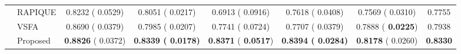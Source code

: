 \documentclass[journal]{IEEEtran}
\begin{document}
{{\begin{table*}[t]
\begin{tabular}{l|l|cccccc}
       & RAPIQUE & 0.8232 ({\color{grey} 0.0529}) & 0.8051 ({\color{grey} 0.0217}) & 0.6913 ({\color{grey} 0.0916}) & 0.7618 ({\color{grey} 0.0408}) & 0.7569 ({\color{grey} 0.0310}) & 0.7755 \\
       & VSFA & 0.8690 ({\color{grey} 0.0379}) & 0.7985 ({\color{grey} 0.0207}) & 0.7741 ({\color{grey} 0.0724}) & 0.7707 ({\color{grey} 0.0379}) & 0.7888 ({\color{grey}\bf{ 0.0225}}) & 0.7938 \\
       & Proposed & {\bf{0.8826}} ({\color{grey} 0.0372}) & \bf{0.8339} ({\color{grey}\bf{ 0.0178}}) & {\bf{0.8371}} ({\color{grey}\bf{ 0.0517}}) & \bf{0.8394} ({\color{grey}\bf{ 0.0284}}) & {\bf{0.8178}} ({\color{grey} 0.0260}) & \bf{0.8330} \\
     \bottomrule
   \end{tabular}
   \label{Table:SingleDatabasePerform_onCKLNY}
\end{table*}

\begin{table}[!htbp]
   \small
	\centering
	\caption{SRCC and PLCC results on LSVQ~\cite{ying2021patch} under the individual database training setting. The database size is shown in the bracket}
	\label{Table:SingleDatabasePerform_onQ}
\end{table}

}}
\end{document}
